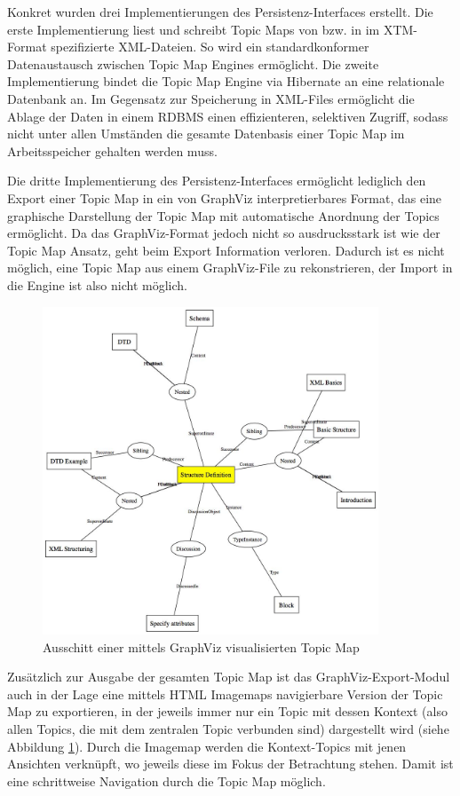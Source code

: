 Konkret wurden drei Implementierungen des Persistenz-Interfaces erstellt. Die erste Implementierung liest und schreibt Topic Maps von bzw. in im \gls{XTM}-Format \citep{XTM06} spezifizierte \gls{XML}-Dateien. So wird ein standardkonformer Datenaustausch zwischen Topic Map Engines ermöglicht. Die zweite Implementierung bindet die Topic Map Engine via Hibernate \citep{Hibernate07} an eine relationale Datenbank an. Im Gegensatz zur Speicherung in XML-Files ermöglicht die Ablage der Daten in einem \gls{RDBMS} einen effizienteren, selektiven Zugriff, sodass nicht unter allen Umständen die gesamte Datenbasis einer Topic Map im Arbeitsspeicher gehalten werden muss.

Die dritte Implementierung des Persistenz-Interfaces ermöglicht lediglich den Export einer Topic Map in ein von GraphViz \citep{Ellson02} interpretierbares Format, das eine graphische Darstellung der Topic Map mit automatische Anordnung der Topics ermöglicht. Da das GraphViz-Format jedoch nicht so ausdrucksstark ist wie der Topic Map Ansatz, geht beim Export Information verloren. Dadurch ist es nicht möglich, eine Topic Map aus einem GraphViz-File zu rekonstrieren, der Import in die Engine ist also nicht möglich. 

\begin{figure}[htbp]
	\centering
		\includegraphics[width=10cm]{img/Persistenz/GraphVizExample.jpg}
	\caption{Ausschitt einer mittels GraphViz visualisierten Topic Map}
	\label{fig:img_Persistenz_GraphViz}
\end{figure}

Zusätzlich zur Ausgabe der gesamten Topic Map ist das GraphViz-Export-Modul auch in der Lage eine mittels HTML Imagemaps navigierbare Version der Topic Map zu exportieren, in der jeweils immer nur ein Topic mit dessen Kontext (also allen Topics, die mit dem zentralen Topic verbunden sind) dargestellt wird (siehe Abbildung \ref{fig:img_Persistenz_GraphViz}). Durch die Imagemap werden die Kontext-Topics mit jenen Ansichten verknüpft, wo jeweils diese im Fokus der Betrachtung stehen. Damit ist eine schrittweise Navigation durch die Topic Map möglich.

